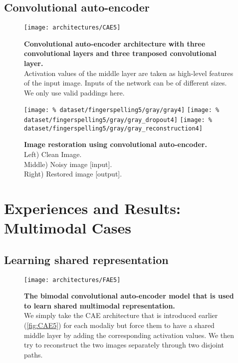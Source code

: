 \subsection{Convolutional auto-encoder} \label{subsection:CAE}

\begin{figure}[H]
  \centering
  \texttt{[image: architectures/CAE5]}
  \caption{%
    \textbf{Convolutional auto-encoder architecture with 
      three convolutional layers and three tranposed convolutional
      layer.}\\[0.1em]
    Activation values of the middle layer are taken as 
      high-level features of the input image. Inputs of the network
      can be of different sizes. We only use valid paddings here.}
  \label{fig:CAE5}
\end{figure}

\begin{figure}[H]
  \centering
  \hfill
  \texttt{[image: \%
    dataset/fingerspelling5/gray/gray4]}
  \hfill
  \texttt{[image: \%
    dataset/fingerspelling5/gray/gray\_dropout4]}
  \hfill
  \texttt{[image: \%
    dataset/fingerspelling5/gray/gray\_reconstruction4]}
  \caption{%
    \textbf{Image restoration using convolutional auto-encoder.}\\[0.1em]
      Left) Clean Image.\\[0.1em]
      Middle) Noisy image [input].\\[0.1em]
      Right) Restored image [output].}
  \label{fig:image_restoration}
\end{figure}

\section{Experiences and Results: Multimodal Cases}

\subsection{Learning shared representation}

\begin{figure}[H]
  \centering
  \texttt{[image: architectures/FAE5]}
  \caption{%
    \textbf{The bimodal convolutional auto-encoder model that is
      used to learn shared multimodal representation.}\\[0.1em]
    We simply take the CAE architecture that is introduced earlier
      (\autoref{fig:CAE5}) for each modaliy but force them to have a
      shared middle layer by adding the corresponding activation values.
      We then try to reconstruct the two images separately through
      two disjoint paths.}
  \label{fig:FAE5}
\end{figure}

